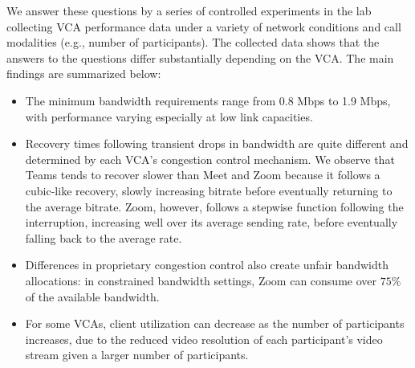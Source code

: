 We answer these questions by a series of controlled experiments in the lab collecting VCA performance data under a variety of network conditions and call modalities (e.g., number of participants). The collected data shows that the answers to the questions differ substantially depending on the VCA. The main findings are summarized below:%
\begin{itemize}
    \item The minimum bandwidth requirements range from 0.8 Mbps to 1.9 Mbps, with performance varying especially at low link capacities. 
    \item Recovery times following transient drops in bandwidth are quite different and determined by each VCA's congestion control mechanism. We observe that Teams tends to recover slower than Meet and Zoom because it follows a cubic-like recovery, slowly increasing bitrate before eventually returning to the average bitrate. Zoom, however, follows a stepwise function following the interruption, increasing well over its average sending rate, before eventually falling back to the average rate.
    \item Differences in proprietary congestion control also create unfair bandwidth allocations: in constrained bandwidth settings, Zoom can consume over $75\%$ of the available bandwidth.
    \item For some VCAs, client utilization can decrease as the number of participants increases, due to the reduced video resolution of each participant's video stream given a larger number of participants.
\end{itemize}






